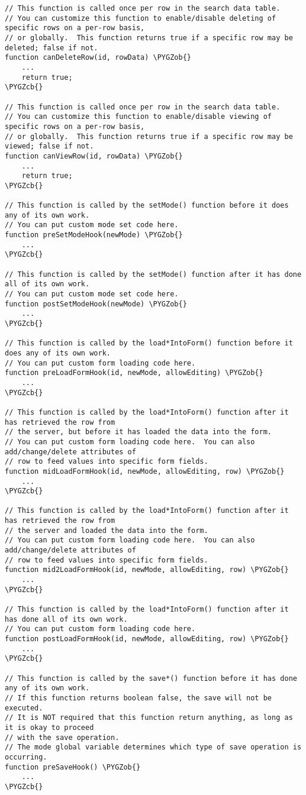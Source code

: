 \documentclass[letterpaper,10pt,english]{sphinxmanual}
\def\PYGZob{\char`\{}
\def\PYGZcb{\char`\}}
\begin{document}
\begin{Verbatim}[commandchars=\\\{\}]
// This function is called once per row in the search data table.
// You can customize this function to enable/disable deleting of specific rows on a per-row basis,
// or globally.  This function returns true if a specific row may be deleted; false if not.
function canDeleteRow(id, rowData) \PYGZob{}
    ...
    return true;
\PYGZcb{}

// This function is called once per row in the search data table.
// You can customize this function to enable/disable viewing of specific rows on a per-row basis,
// or globally.  This function returns true if a specific row may be viewed; false if not.
function canViewRow(id, rowData) \PYGZob{}
    ...
    return true;
\PYGZcb{}

// This function is called by the setMode() function before it does any of its own work.
// You can put custom mode set code here.
function preSetModeHook(newMode) \PYGZob{}
    ...
\PYGZcb{}

// This function is called by the setMode() function after it has done all of its own work.
// You can put custom mode set code here.
function postSetModeHook(newMode) \PYGZob{}
    ...
\PYGZcb{}

// This function is called by the load*IntoForm() function before it does any of its own work.
// You can put custom form loading code here.
function preLoadFormHook(id, newMode, allowEditing) \PYGZob{}
    ...
\PYGZcb{}

// This function is called by the load*IntoForm() function after it has retrieved the row from
// the server, but before it has loaded the data into the form.
// You can put custom form loading code here.  You can also add/change/delete attributes of
// row to feed values into specific form fields.
function midLoadFormHook(id, newMode, allowEditing, row) \PYGZob{}
    ...
\PYGZcb{}

// This function is called by the load*IntoForm() function after it has retrieved the row from
// the server and loaded the data into the form.
// You can put custom form loading code here.  You can also add/change/delete attributes of
// row to feed values into specific form fields.
function mid2LoadFormHook(id, newMode, allowEditing, row) \PYGZob{}
    ...
\PYGZcb{}

// This function is called by the load*IntoForm() function after it has done all of its own work.
// You can put custom form loading code here.
function postLoadFormHook(id, newMode, allowEditing, row) \PYGZob{}
    ...
\PYGZcb{}

// This function is called by the save*() function before it has done any of its own work.
// If this function returns boolean false, the save will not be executed.
// It is NOT required that this function return anything, as long as it is okay to proceed
// with the save operation.
// The mode global variable determines which type of save operation is occurring.
function preSaveHook() \PYGZob{}
    ...
\PYGZcb{}


\end{Verbatim}
\end{document}
